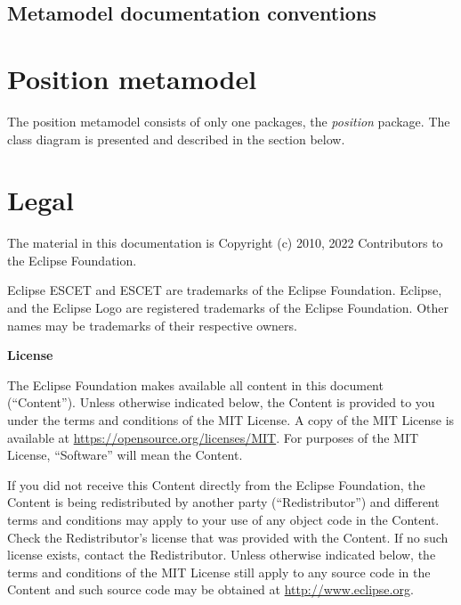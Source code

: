 \documentclass{report}
\begin{document}



\section{Metamodel documentation conventions}




\chapter{Position metamodel}\label{ch:position}

The position metamodel consists of only one packages, the \emph{position}
package. The class diagram is presented and described in the section
below.





\chapter{Legal}

The material in this documentation is
Copyright (c) 2010, 2022 Contributors to the Eclipse Foundation.

Eclipse ESCET and ESCET are trademarks of the Eclipse Foundation.
Eclipse, and the Eclipse Logo are registered trademarks of the
Eclipse Foundation. Other names may be trademarks of their
respective owners.

\textbf{License}

The Eclipse Foundation makes available all content in this document
(``Content''). Unless otherwise indicated below, the Content is provided to you
under the terms and conditions of the MIT License. A copy of the MIT License
is available at \url{https://opensource.org/licenses/MIT}. For purposes of the
MIT License, ``Software'' will mean the Content.

If you did not receive this Content directly from the Eclipse Foundation,
the Content is being redistributed by another party (``Redistributor'') and
different terms and conditions may apply to your use of any object code in
the Content. Check the Redistributor's license that was provided with the
Content. If no such license exists, contact the Redistributor. Unless
otherwise indicated below, the terms and conditions of the MIT License
still apply to any source code in the Content and such source code may be
obtained at \url{http://www.eclipse.org}.





\end{document}
